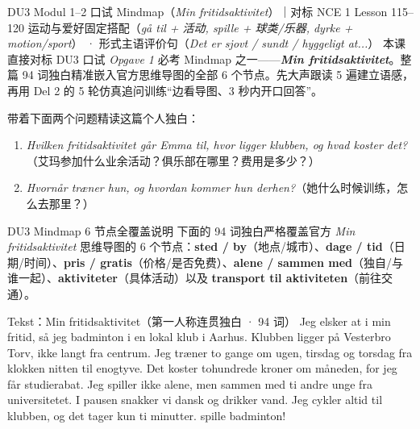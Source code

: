 {DU3 Modul 1--2 口试 Mindmap（\textit{Min fritidsaktivitet}）｜对标 NCE 1 Lesson 115--120}
{运动与爱好固定搭配（\textit{gå til + 活动, spille + 球类/乐器, dyrke + motion/sport}） · 形式主语评价句（\textit{Det er sjovt / sundt / hyggeligt at...}）}
{本课直接对标 DU3 口试 \textit{Opgave 1} 必考 Mindmap 之一——\textbf{\textit{Min fritidsaktivitet}}。整篇 94 词独白精准嵌入官方思维导图的全部 6 个节点。先大声跟读 5 遍建立语感，再用 Del 2 的 5 轮仿真追问训练“边看导图、3 秒内开口回答”。}

\begin{foerduleaeser}
带着下面两个问题精读这篇个人独白：
\begin{enumerate}
  \item \textit{Hvilken fritidsaktivitet går Emma til, hvor ligger klubben, og hvad koster det?}（艾玛参加什么业余活动？俱乐部在哪里？费用是多少？）
  \item \textit{Hvornår træner hun, og hvordan kommer hun derhen?}（她什么时候训练，怎么去那里？）
\end{enumerate}
\end{foerduleaeser}


\begin{tipbox}{DU3 Mindmap 6 节点全覆盖说明}
下面的 94 词独白严格覆盖官方 \textit{Min fritidsaktivitet} 思维导图的 6 个节点：\textbf{sted / by}（地点/城市）、\textbf{dage / tid}（日期/时间）、\textbf{pris / gratis}（价格/是否免费）、\textbf{alene / sammen med}（独自/与谁一起）、\textbf{aktiviteter}（具体活动）以及 \textbf{transport til aktiviteten}（前往交通）。
\end{tipbox}

\begin{emailbox}{Tekst：Min fritidsaktivitet（第一人称连贯独白 · 94 词）}
Jeg elsker at  i min fritid, så jeg  badminton i en lokal klub i Aarhus. Klubben ligger på Vesterbro Torv, ikke langt fra centrum. Jeg træner to gange om ugen, tirsdag og torsdag fra klokken nitten til enogtyve. Det koster tohundrede kroner om måneden, for jeg får studierabat. Jeg spiller ikke alene, men  sammen med ti andre unge fra universitetet. I pausen snakker vi dansk og drikker vand. Jeg cykler altid til klubben, og det tager kun ti minutter.  spille badminton!
\end{emailbox}

